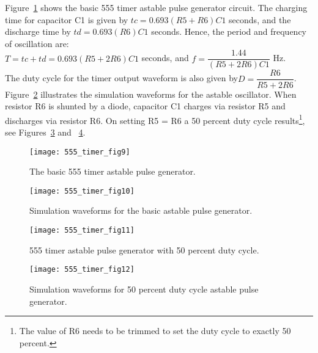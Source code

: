 Figure~\ref{fig:555_timer_fig9} shows the basic 555 timer astable pulse generator circuit. The charging time for capacitor C1 is given by $ tc = 0.693(R5+R6)C1$ seconds, and the discharge time by $ td = 0.693(R6)C1$ seconds. Hence, the period and frequency of oscillation are:\\
 $ T= tc + td = 0.693(R5 + 2R6)C1$ seconds, and $ f = \dfrac{1.44}{(R5+2R6)C1}$ Hz.\\

The duty cycle for the timer output waveform is also given by$ D = \dfrac{R6}{R5+2R6}$.\\

Figure~\ref{fig:555_timer_fig10} illustrates the simulation waveforms for the astable oscillator.
When resistor R6 is shunted by a diode, capacitor C1 charges via resistor R5 and discharges via resistor R6. On setting R5 = R6 a 50 percent duty cycle results\footnote{The value of R6 needs to be trimmed to set the duty cycle to exactly 50 percent.}, see Figures~\ref{fig:555_timer_fig11} and ~\ref{fig:555_timer_fig12}.

\FloatBarrier
\begin{figure}[ht]
  \centering
  \texttt{[image: 555\_timer\_fig9]} 
  \caption{The basic 555 timer astable pulse generator.}
  \label{fig:555_timer_fig9} 
\end{figure} 
\FloatBarrier

\FloatBarrier
\begin{figure}[ht]
  \centering
  \texttt{[image: 555\_timer\_fig10]}
  \caption{Simulation waveforms for the basic astable pulse generator.}
  \label{fig:555_timer_fig10} 
\end{figure} 
\FloatBarrier

\FloatBarrier
\begin{figure}[ht]
  \centering
  \texttt{[image: 555\_timer\_fig11]}
  \caption{555 timer astable pulse generator with 50 percent duty cycle.}
  \label{fig:555_timer_fig11} 
\end{figure} 
\FloatBarrier

\FloatBarrier
\begin{figure}[ht]
  \centering
  \texttt{[image: 555\_timer\_fig12]}
  \caption{Simulation waveforms for 50 percent duty cycle astable pulse generator.}
  \label{fig:555_timer_fig12} 
\end{figure} 
\FloatBarrier



